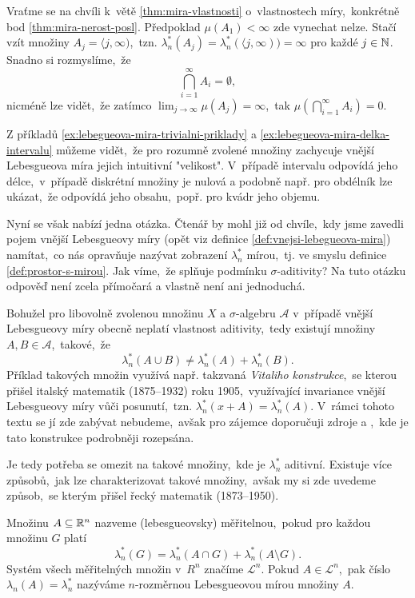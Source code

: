 \begin{remark}
    Vraťme se na chvíli k~větě \ref{thm:mira-vlastnosti} o~vlastnostech míry,~konkrétně bod \ref{thm:mira-nerost-posl}. Předpoklad $\mu(A_1)<\infty$ zde vynechat nelze. Stačí vzít množiny $A_j=\langle j,\infty)$,~tzn. $\lambda_n^*(A_j)=\lambda_n^*(\langle j,\infty))=\infty$ pro každé $j\in\mathbb{N}$. Snadno si rozmyslíme,~že
    \[\bigcap_{i=1}^\infty A_i=\emptyset,\]
    nicméně lze vidět,~že zatímco $\lim_{j\to\infty}\mu(A_j)=\infty$,~tak $\mu(\bigcap_{i=1}^\infty A_i)=0$.
\end{remark}

Z příkladů \ref{ex:lebegueova-mira-trivialni-priklady} a \ref{ex:lebegueova-mira-delka-intervalu} můžeme vidět,~že pro rozumně zvolené množiny zachycuje vnější Lebesgueova míra jejich intuitivní "velikost". V~případě intervalu odpovídá jeho délce,~v~případě diskrétní množiny je nulová a podobně např. pro obdélník lze ukázat,~že odpovídá jeho obsahu,~popř. pro kvádr jeho objemu.

Nyní se však nabízí jedna otázka. Čtenář by mohl již od chvíle,~kdy jsme zavedli pojem vnější Lebesgueovy míry (opět viz definice \ref{def:vnejsi-lebegueova-mira}) namítat,~co nás opravňuje nazývat zobrazení $\lambda_n^*$ mírou,~tj. ve smyslu definice \ref{def:prostor-s-mirou}. Jak víme,~že splňuje podmínku $\sigma$-aditivity? Na tuto otázku odpověď není zcela přímočará a vlastně není ani jednoduchá.

Bohužel pro libovolně zvolenou množinu $X$ a $\sigma$-algebru $\mathcal{A}$ v~případě vnější Lebesgueovy míry obecně neplatí vlastnost aditivity,~tedy existují množiny $A,B\in\mathcal{A}$,~takové,~že
\[\lambda_n^*(A\cup B)\neq\lambda_n^*(A)+\lambda_n^*(B).\]
Příklad takových množin využívá např. takzvaná \emph{Vitaliho konstrukce},~se kterou přišel italský matematik  (1875--1932) roku 1905,~využívající invariance vnější Lebesgueovy míry vůči posunutí,~tzn. $\lambda_n^*(x+A)=\lambda_n^*(A)$. \cite{OConnor2025} V~rámci tohoto textu se jí zde zabývat nebudeme,~avšak pro zájemce doporučuji zdroje \citep[str. 3]{Lukes2013} a \cite{Verner2025},~kde je tato konstrukce podrobněji rozepsána.

Je tedy potřeba se omezit na takové množiny,~kde je $\lambda_n^*$ aditivní. Existuje více způsobů,~jak lze charakterizovat takové množiny,~avšak my si zde uvedeme způsob,~se kterým přišel řecký matematik  (1873--1950).
\begin{definition}\label{def:lebesgueovska-meritelnost}
    Množinu $A\subseteq\mathbb{R}^n$ nazveme (lebesgueovsky) měřitelnou,~pokud pro každou množinu $G$ platí
    \[\lambda_n^*(G)=\lambda_n^*(A\cap G)+\lambda_n^*(A\setminus G).\]
    Systém všech měřitelných množin v~$R^n$ značíme $\mathcal{L}^n$.  Pokud $A\in\mathcal{L}^n$,~pak číslo $\lambda_n(A)=\lambda_n^*$ nazýváme $n$-rozměrnou Lebesgueovou mírou množiny $A$.
\end{definition}

